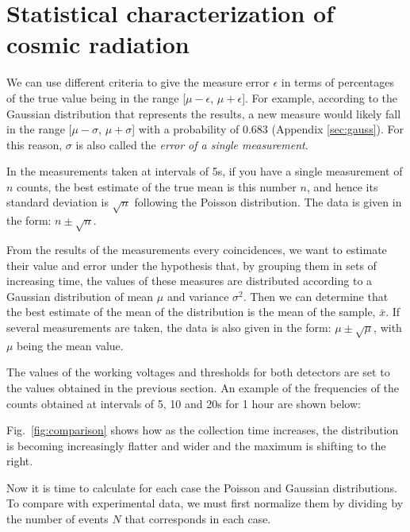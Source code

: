 \section{Statistical characterization of cosmic radiation}

We can use different criteria to give the measure error $\epsilon$ in terms of percentages of the true value being in the range [$\mu - \epsilon$, $\mu + \epsilon$]. For example, according to the Gaussian distribution that represents the results, a new measure would likely fall in the range [$\mu - \sigma$, $\mu + \sigma$] with a probability of 0.683 (Appendix \ref{sec:gauss}). For this reason, $\sigma$ is also called the \textit{error of a single measurement}.


	\bi
		\item In the measurements taken at intervals of 5s, if you have a single measurement of $n$ counts, the best estimate of the true mean is this number $n$, and hence its standard deviation is $\sqrt n$ following the Poisson distribution. The data is given in the form: $n \pm \sqrt n$.

		\item From the results of the measurements every coincidences, we want to estimate their value and error under the hypothesis that, by grouping them in sets of increasing time, the values of these measures are distributed according to a  Gaussian distribution of mean $\mu$ and variance $\sigma^2$. Then we can determine that the best estimate of the mean of the distribution is the mean of the sample, $\bar{x}$. If several measurements are taken, the data is also given in the form: $\mu \pm \sqrt \mu$, with $\mu$ being the mean value.
	\ei

The values of the working voltages and thresholds for both detectors are set to the values obtained in the previous section. An example of the frequencies of the counts obtained at intervals of 5, 10 and 20s for 1 hour are shown below:

Fig.~\ref{fig:comparison} shows how as the collection time increases, the distribution is becoming increasingly flatter and wider and the maximum is shifting to the right.

Now it is time to calculate for each case the Poisson and Gaussian distributions. To compare with experimental data, we must first normalize them by dividing by the number of events $N$ that corresponds in each case.\vfill


